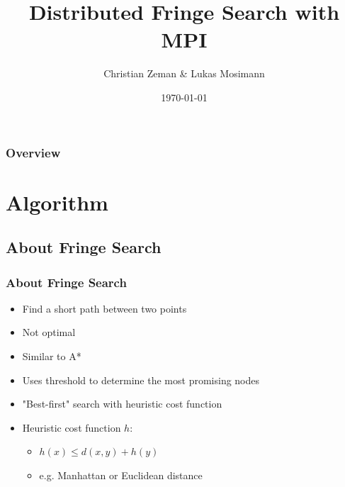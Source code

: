 \documentclass{beamer}
\title[Distributed Fringe Search]{Distributed Fringe Search with MPI} %
\author{Christian Zeman & Lukas Mosimann} %
\institute[ETH] %
{
ETH Zürich \\ %
\medskip
\textit{Design of Parallel and High-Performance Computing} %
}
\date{\today} %
\begin{document}
\begin{frame}
\titlepage %
\end{frame}

\begin{frame}
\frametitle{Overview} %
\tableofcontents %
\end{frame}


\section{Algorithm} %

\subsection{About Fringe Search} %

\begin{frame}
\frametitle{About Fringe Search}
\begin{itemize}
\item Find a short path between two points
\item Not optimal
\item Similar to A*
\item Uses threshold to determine the most promising nodes
\item "Best-first" search with heuristic cost function
\item Heuristic cost function $h$:
	\begin{itemize}
	\item $h(x) \le d(x,y) + h(y)$
	\item e.g. Manhattan or Euclidean distance
	\end{itemize}
\end{itemize}
\end{frame}
\end{document}
